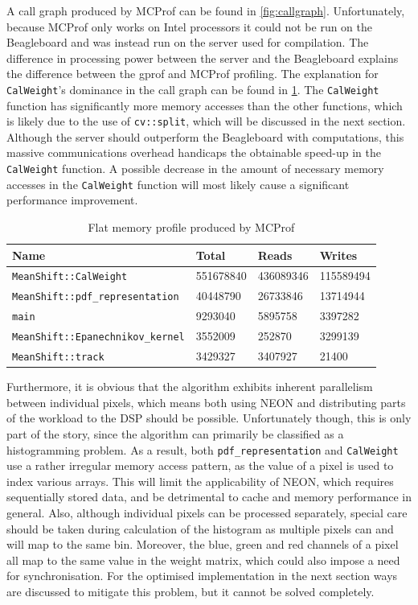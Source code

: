 \documentclass[final]{article}
\begin{document}
A call graph produced by MCProf can be found in \cref{fig:callgraph}.
Unfortunately, because MCProf only works on Intel processors it could not be run on the Beagleboard and was instead run on the server used for compilation.
The difference in processing power between the server and the Beagleboard explains the difference between the gprof and MCProf profiling.
The explanation for \texttt{CalWeight}'s dominance in the call graph can be found in \cref{tab:memprofile}.
The \texttt{CalWeight} function has significantly more memory accesses than the other functions, which is likely due to the use of \texttt{cv::split}, which will be discussed in the next section.
Although the server should outperform the Beagleboard with computations, this massive communications overhead handicaps the obtainable speed-up in the \texttt{CalWeight} function.
A possible decrease in the amount of necessary memory accesses in the \texttt{CalWeight} function will most likely cause a significant performance improvement.

\begin{table}[H]
\centering
\caption{Flat memory profile produced by MCProf}
\label{tab:memprofile}
\begin{tabular}{llll}
\toprule
\textbf{Name} & \textbf{Total} & \textbf{Reads} & \textbf{Writes}\\
\midrule
\texttt{MeanShift::CalWeight}   &  551678840  &   436089346   &  115589494\\
\texttt{MeanShift::pdf\_representation}    &  40448790  &    26733846   &   13714944\\
\texttt{main}   &    9293040   &    5895758    &  3397282\\
\texttt{MeanShift::Epanechnikov\_kernel}    &   3552009       & 252870  &     3299139\\
\texttt{MeanShift::track}   &    3429327   &    3407927      &   21400\\
\bottomrule
\end{tabular}
\end{table}

Furthermore, it is obvious that the algorithm exhibits inherent parallelism between individual pixels, which means both using NEON and distributing parts of the workload to the DSP should be possible.
Unfortunately though, this is only part of the story, since the algorithm can primarily be classified as a histogramming problem.
As a result, both \texttt{pdf\_representation} and \texttt{CalWeight} use a rather irregular memory access pattern, as the value of a pixel is used to index various arrays.
This will limit the applicability of NEON, which requires sequentially stored data, and be detrimental to cache and memory performance in general.
Also, although individual pixels can be processed separately, special care should be taken during calculation of the histogram as multiple pixels can and will map to the same bin.
Moreover, the blue, green and red channels of a pixel all map to the same value in the weight matrix, which could also impose a need for synchronisation.
For the optimised implementation in the next section ways are discussed to mitigate this problem, but it cannot be solved completely.
\end{document}

